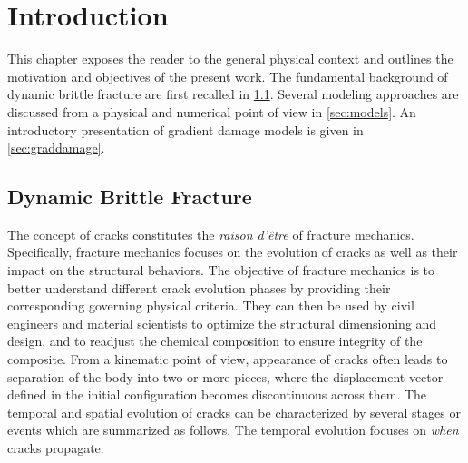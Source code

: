 \chapter{Introduction} \label{chap:introduction}
\minitoc

This chapter exposes the reader to the general physical context and outlines the motivation and objectives of the present work. The fundamental background of dynamic brittle fracture are first recalled in \cref{sec:dynafrac}. Several modeling approaches are discussed from a physical and numerical point of view in \cref{sec:models}. An introductory presentation of gradient damage models is given in \cref{sec:graddamage}.

\section{Dynamic Brittle Fracture} \label{sec:dynafrac}
The concept of cracks constitutes the \emph{raison d'être} of fracture mechanics. Specifically, fracture mechanics focuses on the evolution of cracks as well as their impact on the structural behaviors. The objective of fracture mechanics is to better understand different crack evolution phases by providing their corresponding governing physical criteria. They can then be used by civil engineers and material scientists to optimize the structural dimensioning and design, and to readjust the chemical composition to ensure integrity of the composite. From a kinematic point of view, appearance of cracks often leads to separation of the body into two or more pieces, where the displacement vector defined in the initial configuration becomes discontinuous across them. The temporal and spatial evolution of cracks can be characterized by several stages or events which are summarized as follows. The temporal evolution focuses on \emph{when} cracks propagate: 
